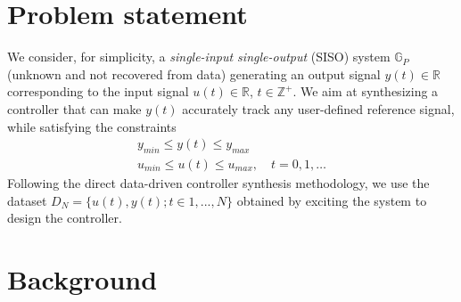 \documentclass[letterpaper, 10 pt, conference]{ieeeconf}  %
\begin{document}
\section{Problem statement}
\label{Problem statement}
We consider, for simplicity, a \textit{single-input single-output} (SISO) system $\mathbb{G}_P$ (unknown and not recovered from data) generating an output signal $y(t) \in \mathbb{R}$ corresponding to the input signal $u(t) \in \mathbb{R}$, $t \in \mathbb{Z}^+$. We aim at synthesizing a controller that can make $y(t)$ accurately track any user-defined reference signal, while satisfying the constraints
\begin{equation} 
\begin{array}{l}
y_{min}\leq y(t) \leq y_{max}\\
u_{min}\leq u(t) \leq u_{max},\quad t=0,1,\ldots
\end{array}
\label{constraints}
\end{equation} 
Following the direct data-driven controller synthesis methodology, we use the dataset $D_{N}=\{u(t),y(t);t\in{1,...,N}\}$ obtained by exciting the system to design the controller. %

\section{Background}
\label{Background}
\end{document}
